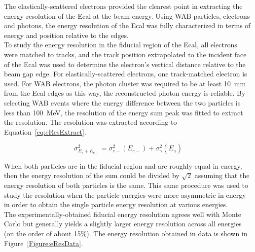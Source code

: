 The elastically-scattered electrons provided the clearest point in extracting the energy resolution of the Ecal at the beam energy. Using WAB particles, electrons and photons, the energy resolution of the Ecal was fully characterized in terms of energy and position relative to the edges.\\
\indent To study the energy resolution in the fiducial region of the Ecal, all electrons were matched to tracks, and the track position extrapolated to the incident face of the Ecal was used to determine the electron's vertical distance relative to the beam gap edge. For elastically-scattered electrons, one track-matched electron is used. For WAB electrons, the photon cluster was required to be at least 10~mm from the Ecal edges as this way, the reconstructed photon energy is reliable. By selecting WAB events where the energy difference between the two particles is less than 100~MeV, the resolution of the energy sum peak was fitted to extract the resolution. The resolution was extracted according to Equation~\eqref{eq:eResExtract}.

\begin{equation}
	\label{eq:eResExtract}
	\sigma_{E_{\gamma}+E_{e-}}^2 = \sigma_{e-}^2(E_{e-})+\sigma_{\gamma}^2(E_{\gamma})
\end{equation}

When both particles are in the fiducial region and are roughly equal in energy, then the energy resolution of the sum could be divided by $\sqrt{2}$ assuming that the energy resolution of both particles is the same. This same procedure was used to study the resolution when the particle energies were more asymmetric in energy in order to obtain the single particle energy resolution at various energies. \\
\indent The experimentally-obtained fiducial energy resolution agrees well with Monte Carlo but generally yields a slightly larger energy resolution across all energies (on the order of about 15$\%$). The energy resolution obtained in data is shown in Figure~\ref{Figure:eResData}.

